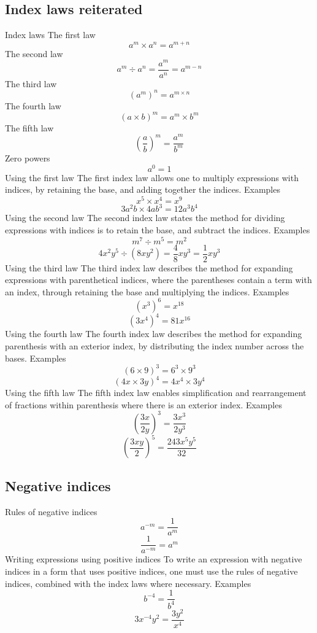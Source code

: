 \begin{outline}
\subsection{Index laws reiterated}
	\1 Index laws
		\2 The first law
			\[a^m \times a^n = a^{m+n}\]
		\2 The second law
			\[a^m \div a^n = \frac{a^m}{a^n} = a^{m-n}\]
		\2 The third law
			\[(a^m) ^n = a^{m \times n}\]
		\2 The fourth law
			\[(a \times b)^m = a^m \times b^m\]
		\2 The fifth law
			\[\left(\frac{a}{b}\right)^m = \frac{a^m}{b^m}\]
		\2 Zero powers
			\[a^0 = 1\]
	\1 Using the first law
		\2 The first index law allows one to multiply expressions with indices, by retaining the base, and adding together the indices.
			\3 Examples
				\[x^5 \times x^4 = x^9\]
				\[3a^2b \times 4ab^3 = 12a^3b^4\]
	\1 Using the second law
		\2 The second index law states the method for dividing expressions with indices is to retain the base, and subtract the indices.
			\3 Examples
				\[m^7 \div m^5 = m^2\]
				\[4x^2y^5 \div (8xy^2) = \frac{4}{8}xy^3 = \frac{1}{2}xy^3\]
	\1 Using the third law
		\2 The third index law describes the method for expanding expressions with parenthetical indices, where the parentheses contain a term with an index, through retaining the base and multiplying the indices.
			\3 Examples
				\[(x^3)^6 = x^{18}\]
				\[(3x^4)^4 = 81x^{16}\]
	\1 Using the fourth law
		\2 The fourth index law describes the method for expanding parenthesis with an exterior index, by distributing the index number across the bases.
			\3 Examples
				\[(6 \times 9)^3 = 6^3 \times 9^3\]
				\[(4x \times 3y)^4 = 4x^4 \times 3y^4\]
	\1 Using the fifth law
		\2 The fifth index law enables simplification and rearrangement of fractions within parenthesis where there is an exterior index.
			\3 Examples
				\[\left(\frac{3x}{2y}\right)^3 = \frac{3x^3}{2y^3}\]
				\[\left(\frac{3xy}{2}\right)^5 = \frac{243x^5y^5}{32}\]

\0
\subsection{Negative indices}
	\1 Rules of negative indices
		\[a^{-m} = \frac{1}{a^m}\]
		\[\frac{1}{a^{-m}} = a^m\]
	\1 Writing expressions using positive indices
		\2 To write an expression with negative indices in a form that uses positive indices, one must use the rules of negative indices, combined with the index laws where necessary.
			\3 Examples
				\[b^{-4} = \frac{1}{b^4}\]
				\[3x^{-4}y^2 = \frac{3y^2}{x^4}\]

\0

\end{outline}
